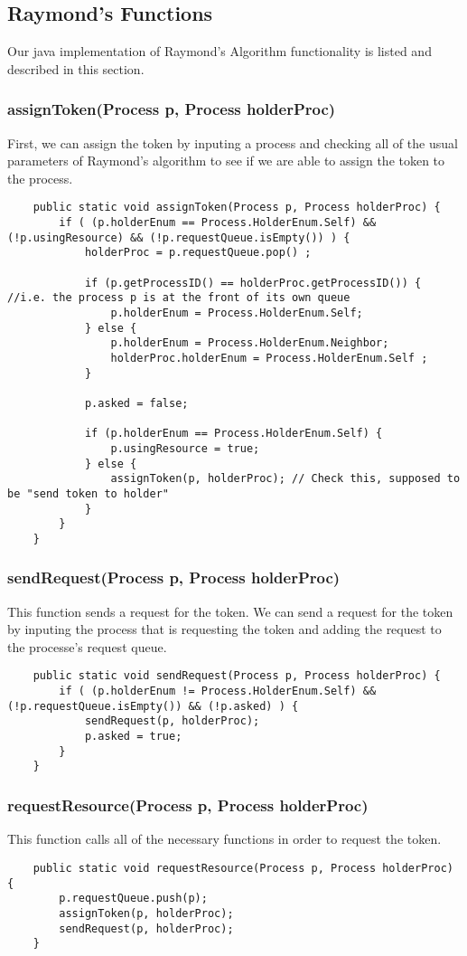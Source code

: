 \documentclass{article}
\begin{document}
	\subsection{Raymond's Functions}
	\label{subsec:RaymondsFunctions}
	Our java implementation of Raymond's Algorithm functionality is listed and described in this section.
	
		\subsubsection{assignToken(Process p, Process holderProc) }
First, we can assign the token by inputing a process and checking all of the usual parameters of Raymond's algorithm to see if we are able to assign the token to the process.
		\begin{lstlisting}
	public static void assignToken(Process p, Process holderProc) {
		if ( (p.holderEnum == Process.HolderEnum.Self) && (!p.usingResource) && (!p.requestQueue.isEmpty()) ) {
			holderProc = p.requestQueue.pop() ;
			
			if (p.getProcessID() == holderProc.getProcessID()) { //i.e. the process p is at the front of its own queue
				p.holderEnum = Process.HolderEnum.Self;
			} else {
				p.holderEnum = Process.HolderEnum.Neighbor;
				holderProc.holderEnum = Process.HolderEnum.Self ;
			}
			
			p.asked = false;
			
			if (p.holderEnum == Process.HolderEnum.Self) {
				p.usingResource = true;
			} else {
				assignToken(p, holderProc); // Check this, supposed to be "send token to holder"
			}
		}
	}
		\end{lstlisting}
		
		\subsubsection{sendRequest(Process p, Process holderProc) }
		This function sends a request for the token. We can send a request for the token by inputing the process that is requesting the token and adding the request to the processe's request queue.
		\begin{lstlisting}
	public static void sendRequest(Process p, Process holderProc) {
		if ( (p.holderEnum != Process.HolderEnum.Self) && (!p.requestQueue.isEmpty()) && (!p.asked) ) {
			sendRequest(p, holderProc);
			p.asked = true;
		}
	}
		\end{lstlisting}
		\subsubsection{requestResource(Process p, Process holderProc) }
		This function calls all of the necessary functions in order to request the token.
		\begin{lstlisting}
	public static void requestResource(Process p, Process holderProc) {
		p.requestQueue.push(p);
		assignToken(p, holderProc);
		sendRequest(p, holderProc);
	}
		\end{lstlisting}
		
\end{document}
